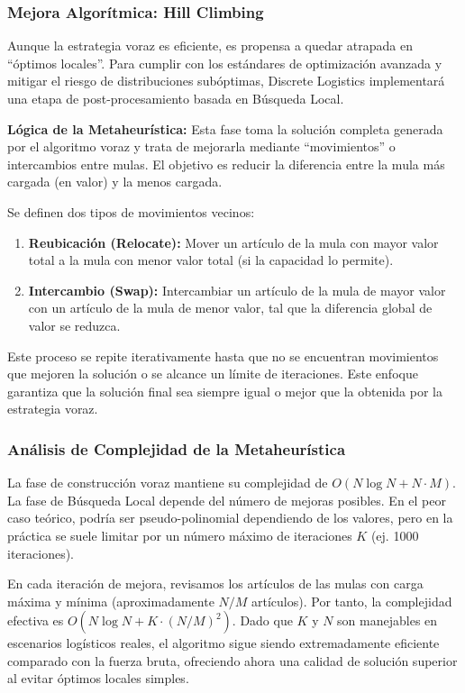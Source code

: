 \documentclass[12pt, a4paper]{article}
\begin{document}
    \subsubsection{Mejora Algorítmica: Hill Climbing}
    Aunque la estrategia voraz es eficiente, es propensa a quedar atrapada en ``óptimos locales''. Para cumplir con los estándares de optimización avanzada y mitigar el riesgo de distribuciones subóptimas, Discrete Logistics implementará una etapa de post-procesamiento basada en Búsqueda Local.

    \textbf{Lógica de la Metaheurística:} Esta fase toma la solución completa generada por el algoritmo voraz y trata de mejorarla mediante ``movimientos'' o intercambios entre mulas. El objetivo es reducir la diferencia entre la mula más cargada (en valor) y la menos cargada.

    Se definen dos tipos de movimientos vecinos:
    \begin{enumerate}
        \item \textbf{Reubicación (Relocate):} Mover un artículo de la mula con mayor valor total a la mula con menor valor total (si la capacidad lo permite).
        \item \textbf{Intercambio (Swap):} Intercambiar un artículo de la mula de mayor valor con un artículo de la mula de menor valor, tal que la diferencia global de valor se reduzca.
    \end{enumerate}

    Este proceso se repite iterativamente hasta que no se encuentran movimientos que mejoren la solución o se alcance un límite de iteraciones. Este enfoque garantiza que la solución final sea siempre igual o mejor que la obtenida por la estrategia voraz.

    \subsubsection{Análisis de Complejidad de la Metaheurística}
    La fase de construcción voraz mantiene su complejidad de $O(N \log N + N \cdot M)$. La fase de Búsqueda Local depende del número de mejoras posibles. En el peor caso teórico, podría ser pseudo-polinomial dependiendo de los valores, pero en la práctica se suele limitar por un número máximo de iteraciones $K$ (ej. 1000 iteraciones).

    En cada iteración de mejora, revisamos los artículos de las mulas con carga máxima y mínima (aproximadamente $N/M$ artículos). Por tanto, la complejidad efectiva es $O(N \log N + K \cdot (N/M)^2)$. Dado que $K$ y $N$ son manejables en escenarios logísticos reales, el algoritmo sigue siendo extremadamente eficiente comparado con la fuerza bruta, ofreciendo ahora una calidad de solución superior al evitar óptimos locales simples.
\end{document}
